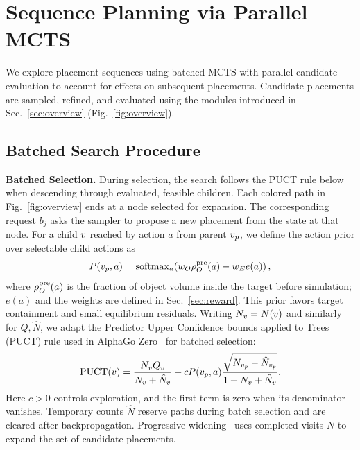 \section{Sequence Planning via Parallel MCTS}\label{sec:sequence_planning}

We explore placement sequences using batched MCTS with parallel candidate evaluation to account for effects on subsequent placements.
Candidate placements are sampled, refined, and evaluated using the modules introduced in Sec.~\ref{sec:overview} (Fig.~\ref{fig:overview}).

\subsection{Batched Search Procedure}\label{sec:mcts}

\noindent \textbf{Batched Selection.}
During selection, the search follows the PUCT rule below when descending through evaluated, feasible children.
Each colored path in Fig.~\ref{fig:overview} ends at a node selected for expansion. The corresponding request $b_j$ asks the sampler to propose a new placement from the state at that node.
For a child $v$ reached by action $a$ from parent $v_p$, we define the action prior over selectable child actions as
\begin{equation*}
 P(v_p,a)=\operatorname{softmax}_{a}\!\left(w_O\rho_O^{\mathrm{pre}}(a)-w_E e(a)\right),
\end{equation*}
where $\rho_O^{\mathrm{pre}}(a)$ is the fraction of object volume inside the target before simulation; $e(a)$ and the weights are defined in Sec.~\ref{sec:reward}.
This prior favors target containment and small equilibrium residuals.
Writing $N_{v}=N(v)$ and similarly for $Q,\hat N$, we adapt the Predictor Upper Confidence bounds applied to Trees (PUCT) rule used in AlphaGo Zero~\cite{silver2017mastering} for batched selection:
\begin{equation}
    \operatorname{PUCT}(v)=\frac{N_{v}Q_{v}}{N_{v}+\hat N_{v}}
    +cP(v_p,a)\frac{\sqrt{N_{v_p}+\hat N_{v_p}}}
         {1+N_{v}+\hat N_{v}}.
    \label{eq:puct}
\end{equation}
Here $c>0$ controls exploration, and the first term is zero when its denominator vanishes. Temporary counts $\hat N$ reserve paths during batch selection and are cleared after backpropagation. Progressive widening~\cite{couetoux2011continuousuct} uses completed visits $N$ to expand the set of candidate placements.

